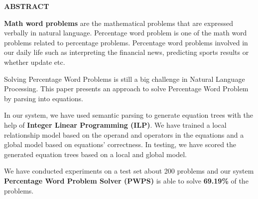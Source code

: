 \documentclass[document.tex]{subfiles}
\begin{document}
	\begin{center}
		\textbf{{\fontsize{16pt}{18}\selectfont ABSTRACT}}
		\vspace{1cm}
	\end{center}
	
	\noindent \textbf{Math word problems} are the mathematical problems
	that are expressed verbally in natural language. Percentage word problem is one of the math word problems related to percentage problems. Percentage word problems involved in our daily life such as interpreting the financial news, predicting sports results or whether update etc. 
	
	
	\noindent Solving Percentage Word Problems is still a big challenge in Natural Language Processing. This paper	presents an approach to solve Percentage Word Problem by parsing into equations. 
	
	\noindent In our system, we have used semantic parsing to generate equation trees with the help of \textbf{Integer Linear Programming (ILP)}. We have trained a local relationship model
	based on the operand and operators in the equations and a global model based on equations’ correctness. In testing, we have scored the generated equation trees based on a local and global model.
	
	\noindent We have conducted experiments on a test set about 200 problems and our system \textbf{Percentage Word Problem Solver (PWPS)} is able to solve \textbf{69.19\%} of the problems.
	
	\clearpage
	
\end{document}
